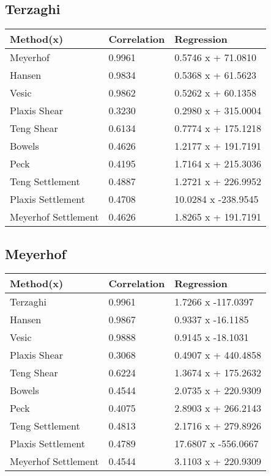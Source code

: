 \subsection{Terzaghi}
\begin{tabularx}{\textwidth}{ | p{} | X | X | }
\hline
\textbf{Method(x)} & \textbf{Correlation} & \textbf{Regression} \\
\hline
 Meyerhof & 0.9961 & 0.5746 x + 71.0810\\
 Hansen & 0.9834 & 0.5368 x + 61.5623\\
 Vesic & 0.9862 & 0.5262 x + 60.1358\\
 Plaxis Shear & 0.3230 & 0.2980 x + 315.0004\\
 Teng Shear & 0.6134 & 0.7774 x + 175.1218\\
 Bowels & 0.4626 & 1.2177 x + 191.7191\\
 Peck & 0.4195 & 1.7164 x + 215.3036\\
 Teng Settlement & 0.4887 & 1.2721 x + 226.9952\\
 Plaxis Settlement & 0.4708 & 10.0284 x  -238.9545\\
 Meyerhof Settlement & 0.4626 & 1.8265 x + 191.7191\\
\hline
\end{tabularx}
\subsection{Meyerhof}
\begin{tabularx}{\textwidth}{ | p{} | X | X | }
\hline
\textbf{Method(x)} & \textbf{Correlation} & \textbf{Regression} \\
\hline
 Terzaghi & 0.9961 & 1.7266 x  -117.0397\\
 Hansen & 0.9867 & 0.9337 x  -16.1185\\
 Vesic & 0.9888 & 0.9145 x  -18.1031\\
 Plaxis Shear & 0.3068 & 0.4907 x + 440.4858\\
 Teng Shear & 0.6224 & 1.3674 x + 175.2632\\
 Bowels & 0.4544 & 2.0735 x + 220.9309\\
 Peck & 0.4075 & 2.8903 x + 266.2143\\
 Teng Settlement & 0.4813 & 2.1716 x + 279.8926\\
 Plaxis Settlement & 0.4789 & 17.6807 x  -556.0667\\
 Meyerhof Settlement & 0.4544 & 3.1103 x + 220.9309\\
\hline
\end{tabularx}
